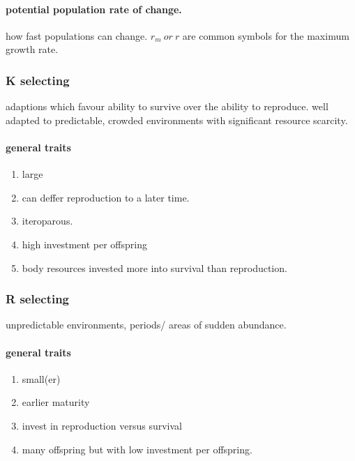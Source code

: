 \documentclass[]{article}
\providecommand{\tightlist}{%
  \setlength{\itemsep}{0pt}\setlength{\parskip}{0pt}}
\let\oldparagraph\paragraph
\renewcommand{\paragraph}[1]{\oldparagraph{#1}\mbox{}}
\begin{document}
\hypertarget{potential-population-rate-of-change.}{%
\paragraph{potential population rate of
change.}\label{potential-population-rate-of-change.}}

how fast populations can change. \(r_{m} ~or~ r\) are common symbols for
the maximum growth rate.

\hypertarget{k-selecting}{%
\subsubsection{K selecting}\label{k-selecting}}

adaptions which favour ability to survive over the ability to reproduce.
well adapted to predictable, crowded environments with significant
resource scarcity.

\hypertarget{general-traits}{%
\paragraph{general traits}\label{general-traits}}

\begin{enumerate}
\def\labelenumi{\arabic{enumi}.}
\tightlist
\item
  large
\item
  can deffer reproduction to a later time.
\item
  iteroparous.
\item
  high investment per offspring
\item
  body resources invested more into survival than reproduction.
\end{enumerate}

\hypertarget{r-selecting}{%
\subsubsection{R selecting}\label{r-selecting}}

unpredictable environments, periods/ areas of sudden abundance.

\hypertarget{general-traits-1}{%
\paragraph{general traits}\label{general-traits-1}}

\begin{enumerate}
\def\labelenumi{\arabic{enumi}.}
\tightlist
\item
  small(er)
\item
  earlier maturity
\item
  invest in reproduction versus survival
\item
  many offspring but with low investment per offspring.
\end{enumerate}
\end{document}
